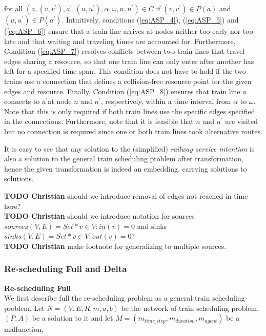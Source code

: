 \documentclass{article}
\begin{document}
for all $(a,(v, v^\prime), a^\prime,(u, u^\prime), \alpha, \omega, n, n^\prime)\in C$ if $(v, v^\prime)\in P(a)$ and $(u, u^\prime)\in P(a^\prime)$.
%
Intuitively, conditions (\ref{eq:ASP_4}), (\ref{eq:ASP_5}) and (\ref{eq:ASP_6}) ensure that a train line arrives at nodes neither too early nor too late and that waiting and traveling times are accounted for. Furthermore, Condition (\ref{eq:ASP_7}) resolves conflicts between two train lines that travel edges sharing a resource, so that one train line can only enter after another has left for a specified time span. This condition does not have to hold if the two trains use a connection that defines a collision-free resource point for the given edges and resource. Finally, Condition (\ref{eq:ASP_8}) ensures that train line $a$ connects to $a^\prime$at node $n$ and $n^\prime$, respectively, within a time interval from $\alpha$ to $\omega$. Note that this is only required if both train lines use the specific edges specified in the connections. Furthermore, note that it is feasible that $n$ and $n^\prime$ are visited but no connection is required since one or both train lines took alternative routes.


It is easy to see that any solution to the (simplified) \emph{railway service intention} is also a solution to the general train scheduling problem after transformation, hence the given transformation is indeed an embedding, carrying solutions to solutions.



\begin{mdframed}
{\bf TODO Christian} should we introduce removal of edges not reached in time here?\\
{\bf TODO Christian} should we introduce notation for sources $sources(V,E)=Set*{v\in V: in(v)=0}$ and sinks $sinks(V,E)=Set*{v\in V: out(v)=0}$?\\
{\bf TODO Christian} make footnote for generalizing to multiple sources.
\end{mdframed}




\subsubsection{Re-scheduling Full and Delta}\label{subsubsec:Delta}


\noindent\textbf{Re-scheduling Full}
\\
We first describe full the re-scheduling problem as a general train scheduling problem. Let $N=(V,E,R,m,a,b)$ be the network of train scheduling problem, $(P,A)$ be a solution to it and let $M=(m_{time\_step},m_{duration},m_{agent})$ be a malfunction.
\end{document}

